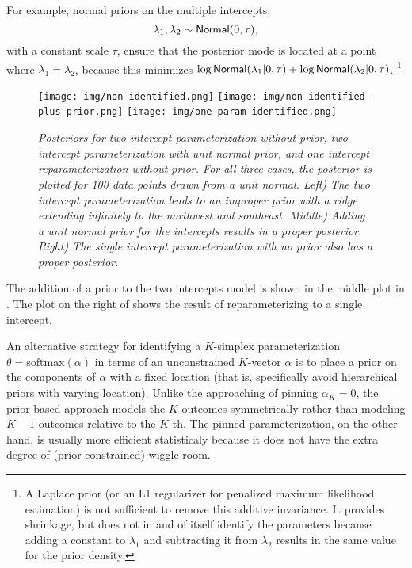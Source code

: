 For example, normal priors on the multiple intercepts,
\[
\lambda_1, \lambda_2 \sim \mbox{\sf Normal}(0,\tau),
\]
with a constant scale $\tau$, ensure that the posterior mode is
located at a point where $\lambda_1 = \lambda_2$, because this
minimizes $\log \mbox{\sf Normal}(\lambda_1|0,\tau) + \log
\mbox{\sf Normal}(\lambda_2|0,\tau)$.%
%
\footnote{A Laplace prior (or an L1 regularizer for penalized maximum
  likelihood estimation) is not sufficient to remove this additive
  invariance.  It provides shrinkage, but does not in and of itself
  identify the parameters because adding a constant to $\lambda_1$ and
  subtracting it from $\lambda_2$ results in the same value for the
  prior density.}
%
\begin{figure}
\texttt{[image: img/non-identified.png]}%
\texttt{[image: img/non-identified-plus-prior.png]}%
\texttt{[image: img/one-param-identified.png]}
\vspace*{-.1in}
\caption{\small\it Posteriors for two intercept parameterization
  without prior, two intercept parameterization with unit normal
  prior, and one intercept reparameterization without prior.  For all
  three cases, the posterior is plotted for 100 data points drawn from
  a unit normal. Left) The two intercept parameterization leads to an
  improper prior with a ridge extending infinitely to the northwest
  and southeast.  Middle) Adding a unit normal prior for the
  intercepts results in a proper posterior.  Right) The single
  intercept parameterization with no prior also has a proper posterior.}%
\label{non-identifiable-density.figure}
\end{figure}
%
The addition of a prior to the two intercepts model is shown in the
middle plot in .  The plot on
the right of  shows the result of
reparameterizing to a single intercept.

An alternative strategy for identifying a $K$-simplex parameterization
$\theta = \mbox{softmax}(\alpha)$ in terms of an unconstrained
$K$-vector $\alpha$ is to place a prior on the components of $\alpha$
with a fixed location (that is, specifically avoid hierarchical priors
with varying location).  Unlike the approaching of pinning $\alpha_K =
0$, the prior-based approach models the $K$ outcomes symmetrically
rather than modeling $K-1$ outcomes relative to the $K$-th.  The
pinned parameterization, on the other hand, is usually more efficient
statisticaly because it does not have the extra degree of (prior
constrained) wiggle room.


